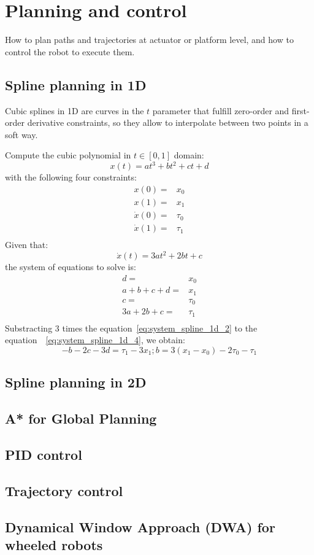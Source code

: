 \section{Planning and control}
How to plan paths and trajectories at actuator or platform level, and how to control the robot to execute them. 

\subsection{Spline planning in 1D}
Cubic splines in 1D are curves in the $t$ parameter that fulfill zero-order and first-order derivative constraints, so they allow to interpolate between two points in a soft way.

Compute the cubic polynomial in $t\in[0,1]$ domain:
\begin{equation}
 x(t) = at^3 + bt^2 + ct + d
\end{equation}
with the following four constraints: 
\begin{align}
 x(0) = & x_0 \\
 x(1) = & x_1 \\
 \dot{x}(0) = & \tau_0 \\
 \dot{x}(1) = & \tau_1 \\
\end{align}
Given that: 
\begin{equation}
 \dot{x}(t) = 3at^2 + 2bt + c
\end{equation}
the system of equations to solve is: 
\begin{align}
 d = & x_0 \\ \label{eq:system_spline_1d_1}
 a+b+c+d = & x_1 \\ \label{eq:system_spline_1d_2}
 c = & \tau_0 \\ \label{eq:system_spline_1d_3}
 3a+2b+c = & \tau_1 \\ \label{eq:system_spline_1d_4}
\end{align}
Substracting 3 times the equation~\ref{eq:system_spline_1d_2} to the equation~~\ref{eq:system_spline_1d_4}, we obtain: 
\begin{equation}
 -b -2c -3d = \tau_1-3x_1; b=3(x_1-x_0) - 2\tau_0 - \tau_1
\end{equation}







\subsection{Spline planning in 2D}

\subsection{A* for Global Planning}

\subsection{PID control}

\subsection{Trajectory control}

\subsection{Dynamical Window Approach (DWA) for wheeled robots}
